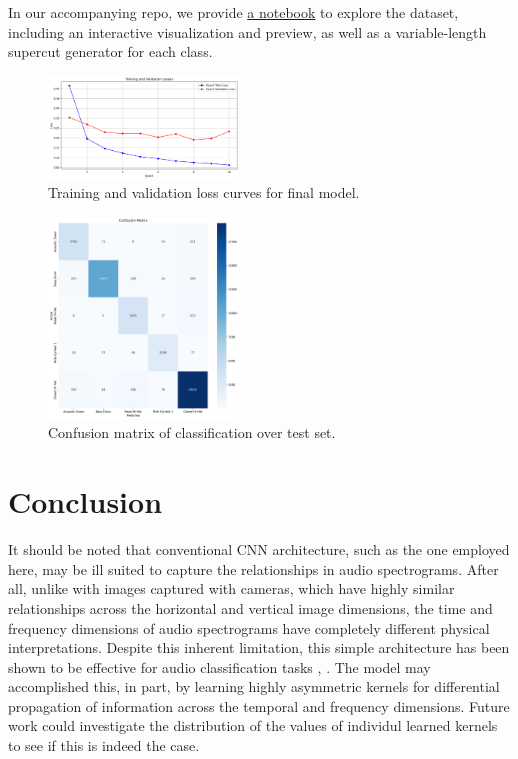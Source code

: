 \documentclass[twocolumn]{article}
\begin{document}
In our accompanying repo, we provide \href{https://github.com/khiner/DrumClassification/blob/main/explore_dataset.ipynb}{a notebook} to explore the dataset, including an interactive visualization and preview, as well as a variable-length supercut generator for each class.
\begin{figure}
\centering
\includegraphics[width=0.45\textwidth]{figures/final_model_loss.png}
\caption{Training and validation loss curves for final model.}
\label{fig:final_model_loss}
\end{figure}

\begin{figure}
\centering
\includegraphics[width=0.45\textwidth]{figures/confusion_matrix.png}
\caption{Confusion matrix of classification over test set.}
\label{fig:confusion_matrix}
\end{figure}

\section{Conclusion}

It should be noted that conventional CNN architecture, such as the one employed here, may be ill suited to capture the relationships in audio spectrograms.
After all, unlike with images captured with cameras, which have highly similar relationships across the horizontal and vertical image dimensions, the time and frequency dimensions of audio spectrograms have completely different physical interpretations.
Despite this inherent limitation, this simple architecture has been shown to be effective for audio classification tasks \cite{piczak_environmental_2015}, \cite{hershey_cnn_2017}.
The model may accomplished this, in part, by learning highly asymmetric kernels for differential propagation of information across the temporal and frequency dimensions.
Future work could investigate the distribution of the values of individul learned kernels to see if this is indeed the case.
\end{document}
